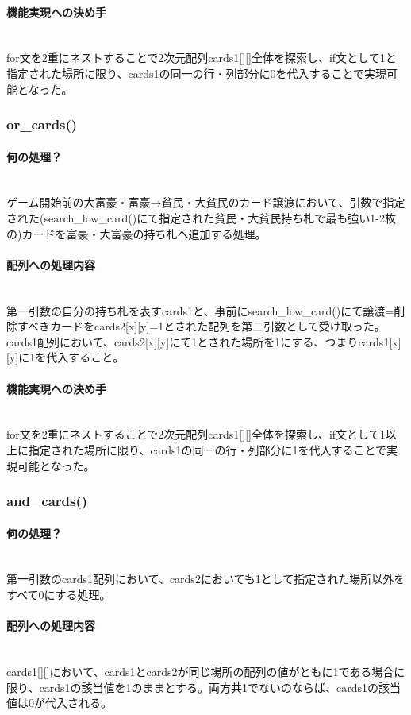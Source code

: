 \documentclass[11pt,a4paper, uplatex]{jsarticle}
\begin{document}
\paragraph{機能実現への決め手}\mbox{}\\
for文を2重にネストすることで2次元配列cards1[][]全体を探索し、if文として1と指定された場所に限り、cards1の同一の行・列部分に0を代入することで実現可能となった。
%
\subsubsection{or\_cards()}
\paragraph{何の処理？}\mbox{}\\
ゲーム開始前の大富豪・富豪→貧民・大貧民のカード譲渡において、引数で指定された(search\_low\_card()にて指定された貧民・大貧民持ち札で最も強い1-2枚の)カードを富豪・大富豪の持ち札へ追加する処理。
\paragraph{配列への処理内容}\mbox{}\\
第一引数の自分の持ち札を表すcards1と、事前にsearch\_low\_card()にて譲渡=削除すべきカードをcards2[x][y]=1とされた配列を第二引数として受け取った。cards1配列において、cards2[x][y]にて1とされた場所を1にする、つまりcards1[x][y]に1を代入すること。
\paragraph{機能実現への決め手}\mbox{}\\
for文を2重にネストすることで2次元配列cards1[][]全体を探索し、if文として1以上に指定された場所に限り、cards1の同一の行・列部分に1を代入することで実現可能となった。
%
\subsubsection{and\_cards()}
\paragraph{何の処理？}\mbox{}\\
第一引数のcards1配列において、cards2においても1として指定された場所以外をすべて0にする処理。
\paragraph{配列への処理内容}\mbox{}\\
cards1[][]において、cards1とcards2が同じ場所の配列の値がともに1である場合に限り、cards1の該当値を1のままとする。両方共1でないのならば、cards1の該当値は0が代入される。
\end{document}
